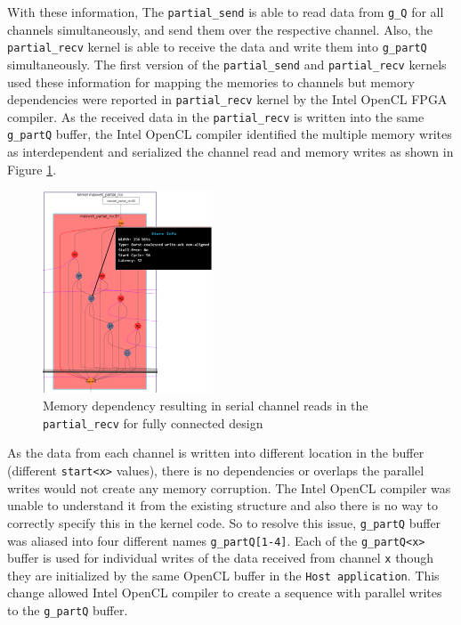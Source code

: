 With these information, The \texttt{partial\_send} is able to read data from \texttt{g\_Q}
for all channels simultaneously, and send them over the respective channel. Also, the \texttt{partial\_recv}
kernel is able to receive the data and write them into \texttt{g\_partQ} simultaneously. The first
version of the \texttt{partial\_send} and \texttt{partial\_recv} kernels used these information for
mapping the memories to channels but memory dependencies were reported in \texttt{partial\_recv} kernel by the Intel OpenCL FPGA compiler.
As the received data in the \texttt{partial\_recv} is written into the same \texttt{g\_partQ} buffer,
the Intel OpenCL compiler identified the multiple memory writes as interdependent and serialized the channel
read and memory writes as shown in Figure \ref{fig:serial_reads}.
\begin{figure}[ht]%
    \centering
    \includegraphics[width=0.45\textwidth]{images/serial_reads}
    \caption{Memory dependency resulting in serial channel reads in the \texttt{partial\_recv}
    for fully connected design}
    \label{fig:serial_reads}
\end{figure}
As the data from each channel is written
into different location in the buffer (different \texttt{start<x>} values), there is no
dependencies or overlaps the parallel writes would not create any memory corruption. The Intel OpenCL compiler
was unable to understand it from the existing structure and also there is no way to correctly specify this in the kernel code.
So to resolve this issue, \texttt{g\_partQ} buffer was aliased into four
different names \texttt{g\_partQ[1-4]}. Each of the \texttt{g\_partQ<x>} buffer is used
for individual writes of the data received from channel \texttt{x} though they are initialized by the same
OpenCL buffer in the \texttt{Host application}. This change allowed
Intel OpenCL compiler to create a sequence with parallel writes to the \texttt{g\_partQ} buffer.


